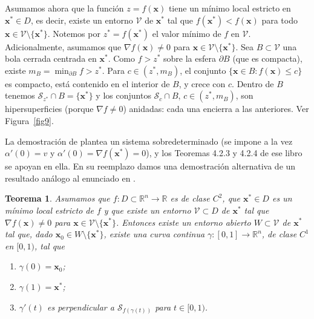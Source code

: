 \documentclass[12pt, a4paper]{amsbook}
\newcommand{\R}{{\mathbb R}}
\newcommand{\Vc}{{\mathcal V}}
\newcommand{\Sw}{{\mathcal S}}
\newcommand{\xx}{{\mathbf x}}
\newtheorem{teo}{Teorema}[section]
\theoremstyle{remark}
\theoremstyle{definition}
\numberwithin{section}{chapter}
\numberwithin{subsection}{section}
\numberwithin{equation}{section}
\numberwithin{figure}{chapter}
\begin{document}
Asumamos ahora que la función $z=f(\xx)$ tiene un mínimo local estricto en $\xx^*\in D$, es decir, existe un entorno $\Vc$ de $\xx^*$ tal que $f(\xx^*)<f(\xx)$ para todo $\xx\in \Vc\setminus\{\xx^*\}$. Notemos por $z^*=f(\xx^*)$ el valor mínimo de $f$ en $\Vc$. Adicionalmente, asumamos que $\nabla f(\xx)\neq 0$ para $\xx\in \Vc\setminus\{\xx^*\}$. Sea $B\subset\Vc$ una bola cerrada centrada en $\xx^*$. Como $f>z^*$ sobre la esfera $\partial B$ (que es compacta), existe $m_B=\min_{\partial B}f>z^*$. Para $c\in(z^*,m_B)$, el conjunto $\{\xx\in B\colon f(\xx)\le c\}$ es compacto, está contenido en el interior de $B$, y crece con $c$. Dentro de $B$ tenemos $\Sw_{z^*}\cap B=\{\xx^*\}$ y los conjuntos $\Sw_c\cap B$, $c\in(z^*,m_B)$, son hipersuperficies (porque $\nabla f\ne0$) anidadas: cada una encierra a las anteriores. Ver Figura~\ref{fig9}.

La demostración de \cite[Lemma 4.2.2]{Calin} plantea un sistema sobredeterminado (se impone a la vez $\alpha'(0)=v$ y $\alpha'(0)=\nabla f(\xx^*)=0$), y los Teoremas 4.2.3 y 4.2.4 de ese libro se apoyan en ella. En su reemplazo damos una demostración alternativa de un resultado análogo al enunciado en \cite[Theorem 4.2.3]{Calin}.

\begin{teo}\label{4.2.2}
Asumamos que $f\colon D\subset\R^n\to\R$ es de clase $C^2$, que $\xx^*\in D$ es un mínimo local estricto de $f$ y que existe un entorno $\Vc\subset D$ de $\xx^*$ tal que $\nabla f(\xx)\neq 0$ para $\xx\in \Vc\setminus\{\xx^*\}$. Entonces existe un entorno abierto $W\subset\Vc$ de $\xx^*$ tal que, dado $\xx_0\in W\setminus\{\xx^*\}$, existe una curva continua $\gamma\colon [0,1]\to \R^n$, de clase $C^1$ en $[0,1)$, tal que
\begin{enumerate}
\item $\gamma(0) = \xx_0$;
\item $\gamma(1) = \xx^*$;
\item $\gamma'(t)$ es perpendicular a $\Sw_{f(\gamma(t))}$ para $t\in [0, 1)$.
\end{enumerate}
\end{teo}
\end{document}
